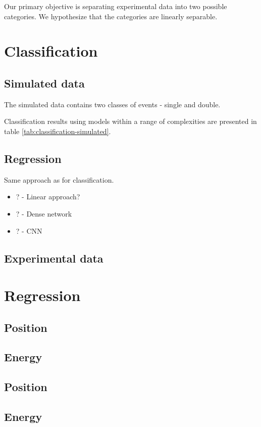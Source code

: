 Our primary objective is separating experimental data into two possible categories.
We hypothesize that the categories are linearly separable.
\section{Classification}

\subsection{Simulated data}
The simulated data contains two classes of events - single and double. 


Classification results using models within a range of complexities are presented in table
\ref{tab:classification-simulated}.



\subsection{Regression}
Same approach as for classification.
\begin{itemize}
  \item ? - Linear approach?
  \item ? - Dense network
  \item ? - CNN
\end{itemize}
\subsection{Experimental data}
\section{Regression}
\subsection{Position}
\subsection{Energy}
\subsection{Position}
\subsection{Energy}
